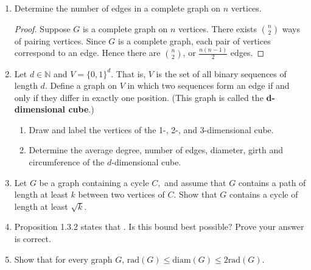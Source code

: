 \documentclass[12pt]{article}
\renewcommand{\emph}[1]{\textsf{\textbf{#1}}}
\newcommand{\bbN}{\mathbb{N}}
\newcommand{\rad}{\text{rad}}
\newcommand{\diam}{\text{diam}}
\begin{document}
\begin{enumerate}
\item Determine the number of edges in a complete graph on $n$ vertices.
\begin{proof} Suppose $G$ is a complete graph on $n$ vertices. There exists $n \choose 2$ ways 
	of pairing vertices. Since $G$ is a complete graph, each pair of vertices correspond to an edge. 
	Hence there are $n \choose 2$, or $\frac{n(n - 1)}{2}$ edges. 
	
\end{proof}


\item Let $d \in \bbN$ and $V=\{0,1\}^d.$ That is, $V$ is the set of all binary sequences of length $d.$ Define a graph on $V$ in which two sequences form an edge if and only if they differ in exactly one position. (This graph is called the \emph{d-dimensional cube}.) 
	\begin{enumerate}
	\item Draw and label the vertices of the 1-, 2-, and 3-dimensional cube.
	\item Determine the average degree, number of edges, diameter, girth and circumference of the $d$-dimensional cube.
	\end{enumerate}
\item  Let $G$ be a graph containing a cycle $C,$ and assume that $G$ contains a path of length at least $k$ between two vertices of $C.$ Show that $G$ contains a cycle of length at least $\sqrt{k}$.
\item Proposition 1.3.2 states that . Is this bound best possible? Prove your answer is correct.
\item Show that for every graph $G$, $\rad(G) \leq \diam(G) \leq 2\rad(G).$
\end{enumerate}
\end{document}
